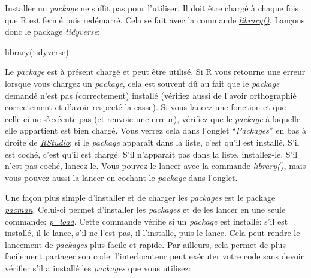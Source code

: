 \documentclass[
]{book}
\newenvironment{Shaded}{\begin{snugshade}}{\end{snugshade}}
\newcommand{\FunctionTok}[1]{\textcolor[rgb]{0.00,0.00,0.00}{#1}}
\newcommand{\NormalTok}[1]{#1}
\begin{document}
Installer un \emph{package} ne suffit pas pour l'utiliser. Il doit être chargé à chaque fois que R est fermé puis redémarré. Cela se fait avec la commande \href{https://www.rdocumentation.org/packages/base/versions/3.6.2/topics/library}{\emph{library()}}. Lançons donc le package \emph{tidyverse}:

\begin{Shaded}
\begin{Highlighting}[]
\FunctionTok{library}\NormalTok{(tidyverse)}
\end{Highlighting}
\end{Shaded}

Le \emph{package} est à présent chargé et peut être utilisé. Si R vous retourne une erreur lorsque vous chargez un \emph{package}, cela est souvent dû au fait que le \emph{package} demandé n'est pas (correctement) installé (vérifiez aussi de l'avoir orthographié correctement et d'avoir respecté la casse). Si vous lancez une fonction et que celle-ci ne s'exécute pas (et renvoie une erreur), vérifiez que le \emph{package} à laquelle elle appartient est bien chargé. Vous verrez cela dans l'onglet ``\emph{Packages}'' en bas à droite de \href{https://posit.co/}{\emph{RStudio}}: si le \emph{package} apparaît dans la liste, c'est qu'il est installé. S'il est coché, c'est qu'il est chargé. S'il n'apparaît pas dans la liste, installez-le. S'il n'est pas coché, lancez-le. Vous pouvez le lancer avec la commande \href{https://www.rdocumentation.org/packages/base/versions/3.6.2/topics/library}{\emph{library()}}, mais vous pouvez aussi la lancer en cochant le \emph{package} dans l'onglet.

Une façon plus simple d'installer et de charger les \emph{packages} est le package \href{http://trinker.github.io/pacman/vignettes/Introduction_to_pacman.html}{\emph{pacman}}. Celui-ci permet d'installer les \emph{packages} et de les lancer en une seule commande: \href{https://www.rdocumentation.org/packages/pacman/versions/0.5.1/topics/p_load}{\emph{p\_load}}. Cette commande vérifie si un \emph{package} est installé: s'il est installé, il le lance, s'il ne l'est pas, il l'installe, puis le lance. Cela peut rendre le lancement de \emph{packages} plus facile et rapide. Par ailleurs, cela permet de plus facilement partager son code: l'interlocuteur peut exécuter votre code sans devoir vérifier s'il a installé les \emph{packages} que vous utilisez:
\end{document}
